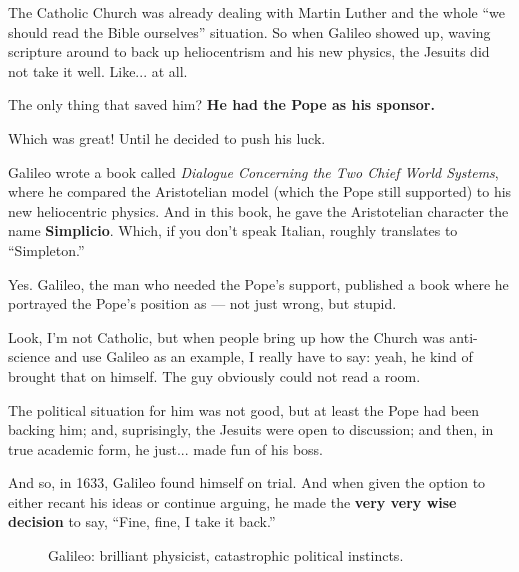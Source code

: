 \vspace{1em}


The Catholic Church was already dealing with Martin Luther and the whole ``we should read the Bible ourselves'' situation. So when Galileo showed up, waving scripture around to back up heliocentrism and his new physics, the Jesuits did not take it well. Like... at all.

The only thing that saved him? \textbf{He had the Pope as his sponsor.} 

Which was great! Until he decided to push his luck. 

Galileo wrote a book called \textit{Dialogue Concerning the Two Chief World Systems}, where he compared the Aristotelian model (which the Pope still supported) to his new heliocentric physics. And in this book, he gave the Aristotelian character the name \textbf{Simplicio}. Which, if you don’t speak Italian, roughly translates to “Simpleton.”

Yes. Galileo, the man who needed the Pope’s support, published a book where he portrayed the Pope’s position as --- not just wrong, but stupid. 

Look, I’m not Catholic, but when people bring up how the Church was anti-science and use Galileo as an example, I really have to say: yeah, he kind of brought that on himself. The guy obviously could not read a room. 

The political situation for him was not good, but at least the Pope had been backing him; and, suprisingly, the Jesuits were open to discussion; and then, in true academic form, he just... made fun of his boss. 

And so, in 1633, Galileo found himself on trial. And when given the option to either recant his ideas or continue arguing, he made the \textbf{very very wise decision} to say, ``Fine, fine, I take it back.''

\begin{figure}[H]
\centering
{}
\caption{Galileo: brilliant physicist, catastrophic political instincts.}
\end{figure}
